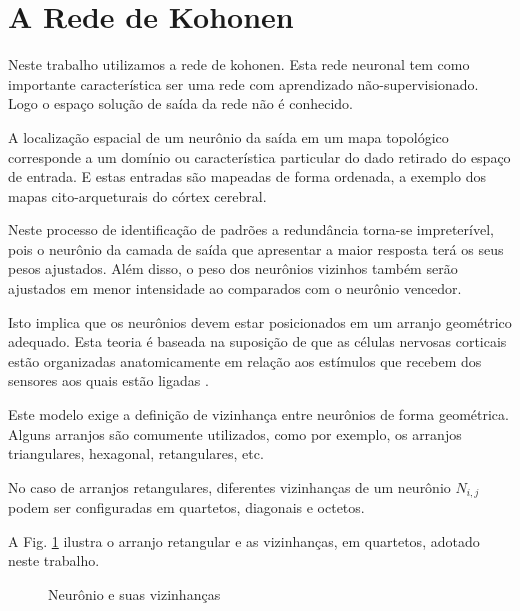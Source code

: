 \section{A Rede de Kohonen}

Neste trabalho utilizamos a rede de kohonen. Esta rede neuronal tem como importante característica ser uma rede com aprendizado não-supervisionado. Logo o espaço solução de saída da rede não é conhecido. 

A localização espacial de um neurônio da saída em um mapa topológico
corresponde a um domínio ou característica particular do dado retirado do espaço de entrada. E estas entradas são mapeadas de forma ordenada, a exemplo dos mapas cito-arqueturais do córtex cerebral.

Neste processo de identificação de padrões a redundância torna-se impreterível,
pois o neurônio da camada de saída que apresentar a maior resposta terá os seus
pesos ajustados. Além disso, o peso dos neurônios vizinhos também serão
ajustados em menor intensidade ao comparados com o neurônio vencedor.

Isto implica que os neurônios devem estar posicionados em um arranjo geométrico
adequado. Esta teoria é baseada na suposição de que as células nervosas
corticais estão organizadas anatomicamente em relação aos estímulos que recebem
dos sensores aos quais estão ligadas \citep{Artero2009}.

Este modelo exige a definição de vizinhança entre neurônios de forma geométrica. Alguns arranjos são comumente utilizados, como por exemplo, os arranjos triangulares, hexagonal, retangulares, etc.

No caso de arranjos retangulares, diferentes vizinhanças de um neurônio
$N_{i,j}$ podem ser configuradas em quartetos, diagonais e octetos. 

A Fig. \ref{hiperplano} ilustra o arranjo retangular e as vizinhanças, em quartetos, adotado neste trabalho. 

\begin{figure}[H]
	\centering
	\setlength{\fboxsep}{8pt}
	\setlength{\fboxrule}{0.1pt}
	\caption{Neurônio e suas vizinhanças}
	\label{hiperplano}
\end{figure}

